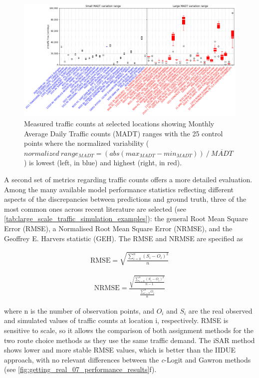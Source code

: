 \begin{figure}[htbp!]
    \centering
    \includegraphics[width=1\textwidth]{fig_10.png}
    \caption{Measured traffic counts at selected locations showing Monthly Average Daily Traffic counts (MADT) ranges with the 25 control points where the normalized variability ($normalized\ range_{MADT}=(abs(max_{MADT}-min_{MADT}))⁄\overline{MADT}$) is lowest (left, in blue) and highest (right, in red).}
   \label{fig:getting_real_10_traffic_counts_locations}
\end{figure}

A second set of metrics regarding traffic counts offers a more detailed evaluation. Among the many available model performance statistics reflecting different aspects of the discrepancies between predictions and ground truth, three of the most common ones across recent literature are selected \citep{Balakrishna2007,Yu2017} (see \autoref{tab:large_scale_traffic_simulation_examples}): the general Root Mean Square Error (RMSE), a Normalised Root Mean Square Error (NRMSE), and the Geoffrey E. Harvers statistic (GEH).
The RMSE and NRMSE are specified as

\begin{align}
   \text{RMSE} = \sqrt{\frac{\sum_{i=0}^n (S_i - O_i)^2}{n}} \label{eq:RMSE}
\end{align}

\begin{align}
   \text{NRMSE} = \frac{\sqrt{\frac{\sum_{i=0}^{n} (S_i - O_i)^2}{n-1}}}{\frac{\sum_{i=0}^{n} O_i}{n}} \label{eq:NRMSE}
\end{align}

where n is the number of observation points, and $O_i$ and $S_i$ are the real observed and simulated values of traffic counts at location i, respectively. RMSE is sensitive to scale, so it allows the comparison of both assignment methods for the two route choice methods as they use the same traffic demand. The iSAR method shows lower and more stable RMSE values, which is better than the IIDUE approach, with no relevant differences between the \emph{c}-Logit and Gawron methods (see \autoref{fig:getting_real_07_performance_results}f).


